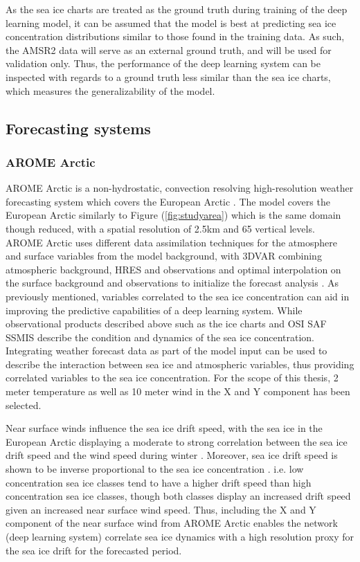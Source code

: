 \documentclass[../main/thesis.tex]{subfiles}
\begin{document}
As the sea ice charts are treated as the ground truth during training of the deep learning model, it can be assumed that the model is best at predicting sea ice concentration distributions similar to those found in the training data. As such, the AMSR2 data will serve as an external ground truth, and will be used for validation only. Thus, the performance of the deep learning system can be inspected with regards to a ground truth less similar than the sea ice charts, which measures the generalizability of the model. 

\subsection{Forecasting systems}
 
\subsubsection{AROME Arctic}
AROME Arctic is a non-hydrostatic, convection resolving high-resolution weather forecasting system which covers the European Arctic \citep{Mueller2017}. The model covers the European Arctic similarly to Figure (\ref{fig:studyarea}) which is the same domain though reduced, with a spatial resolution of 2.5km and 65 vertical levels. AROME Arctic uses different data assimilation techniques for the atmosphere and surface variables from the model background, with 3DVAR combining atmospheric background, HRES and observations and optimal interpolation on the surface background and observations to initialize the forecast analysis \cite{Mueller2017}. As previously mentioned, variables correlated to the sea ice concentration can aid in improving the predictive capabilities of a deep learning system. While observational products described above such as the ice charts \citep{Dinessen2020} and OSI SAF SSMIS \citep{Tonboe2017} describe the condition and dynamics of the sea ice concentration. Integrating weather forecast data as part of the model input can be used to describe the interaction between sea ice and atmospheric variables, thus providing correlated variables to the sea ice concentration. For the scope of this thesis, 2 meter temperature as well as 10 meter wind in the X and Y component has been selected.

Near surface winds influence the sea ice drift speed, with the sea ice in the European Arctic displaying a moderate to strong correlation between the sea ice drift speed and the wind speed during winter \citep{Spreen2011}. Moreover, sea ice drift speed is shown to be inverse proportional to the sea ice concentration \citep{Yu2020}. i.e. low concentration sea ice classes tend to have a higher drift speed  than high concentration sea ice classes, though both classes display an increased drift speed given an increased near surface wind speed. Thus, including the X and Y component of the near surface wind from AROME Arctic enables the network (deep learning system) correlate sea ice dynamics with a high resolution proxy for the sea ice drift for the forecasted period.
\end{document}
